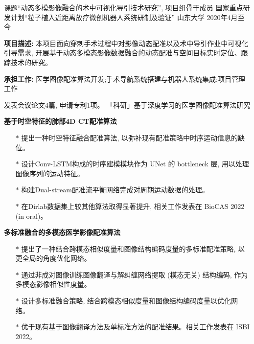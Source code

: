 

\begin{cventries}
  \cventry
    {课题“动态多模影像融合的术中可视化导引技术研究”, 项目组骨干成员}%
    {国家重点研发计划“粒子植入近距离放疗微创机器人系统研制及验证”}  %
    {山东大学} %
    {2020年4月至今} %
    {      
      \begin{cvitems} %
        \item{\textbf{项目描述: }本项目面向穿刺手术过程中对影像动态配准以及术中导引作业中可视化引导需求, 
        开展基于动态多模态影像数据融合的动态配准与空间目标实时定位、跟踪技术的研究。}
        \item{\textbf{承担工作: }医学图像配准算法开发;手术导航系统搭建与机器人系统集成;项目管理工作}
      \end{cvitems}
    }
  \cventry
    {发表会议论文4篇, 申请专利1项。} %
    {「科研」基于深度学习的医学图像配准算法研究} %
    {} %
    {} %
    {
      \begin{cvitems}
        \item \textbf{基于时空特征的肺部4D CT配准算法}
        \begin{itemize}[leftmargin=*,topsep=5 pt, partopsep=5 pt]
          \item[$\ast$] 提出一种时空特征融合配准算法, 以弥补现有配准策略中时序运动信息的缺位。
          \item[$\ast$] 设计Conv-LSTM构成的时序建模模块作为 UNet 的 bottleneck 层, 用以处理图像序列的运动特征。
          \item[$\ast$] 构建Dual-stream配准流平衡网络完成对周期运动数据的处理。
          \item[$\ast$] 在Dirlab数据集上较其他算法取得显著提升, 相关工作发表在 BioCAS 2022 (in oral)。
        \end{itemize}
        \item \textbf{多标准融合的多模态医学影像配准算法}
        \begin{itemize}[leftmargin=*,topsep=5 pt, partopsep=5 pt]
          \item[$\ast$] 提出了一种结合跨模态相似度量和图像结构编码度量的多标准配准策略, 以更全局的角度优化网络。
          \item[$\ast$] 通过非成对图像训练图像翻译与解纠缠网络提取 (模态无关) 结构编码, 作为多模态影像相似性度量。
          \item[$\ast$] 设计多标准融合策略, 结合跨模态相似度量和图像结构编码度量以优化网络。
          \item[$\ast$] 优于现有基于图像翻译方法及单标准方法的配准结果。相关工作发表在 ISBI 2022。
        \end{itemize}
      \end{cvitems}
    }
    

\end{cventries}
